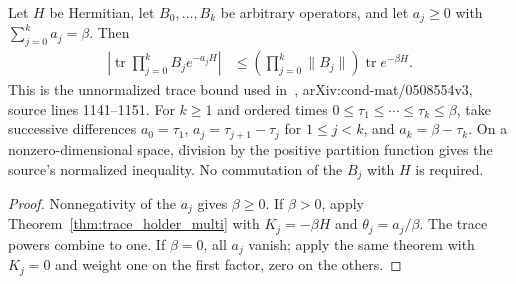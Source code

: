 \begin{theorem}
    \label{thm:trace_holder_imaginary_time}
    \leanok
    Let $H$ be Hermitian, let $B_0,\ldots,B_k$ be arbitrary operators,
    and let $a_j\ge0$ with $\sum_{j=0}^k a_j=\beta$. Then
    \begin{align}
        \left|\operatorname{tr}\prod_{j=0}^k B_j e^{-a_jH}\right|
         & \le \left(\prod_{j=0}^k\|B_j\|\right)
        \operatorname{tr}e^{-\beta H}.
        \label{eq:trace_holder_imaginary_time}
    \end{align}
    This is the unnormalized trace bound used
    in~\cite{Hastings2006Solving}, arXiv:cond-mat/0508554v3,
    source lines 1141--1151. For $k\ge1$ and ordered times
    $0\le\tau_1\le\cdots\le\tau_k\le\beta$, take successive differences
    $a_0=\tau_1$, $a_j=\tau_{j+1}-\tau_j$ for $1\le j<k$, and $a_k=\beta-\tau_k$.
    On a nonzero-dimensional space, division by the positive partition
    function gives the source's normalized inequality. No commutation of
    the $B_j$ with $H$ is required.
\end{theorem}
\begin{proof}\leanok
    Nonnegativity of the $a_j$ gives $\beta\ge0$. If $\beta>0$, apply
    Theorem~\ref{thm:trace_holder_multi} with $K_j=-\beta H$ and
    $\theta_j=a_j/\beta$. The trace powers combine to one.
    If $\beta=0$, all $a_j$ vanish; apply the same theorem with $K_j=0$
    and weight one on the first factor, zero on the others.
\end{proof}

